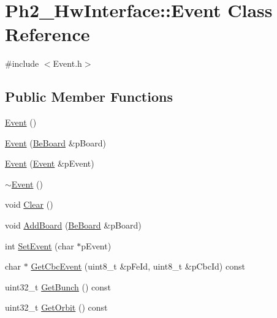 \hypertarget{class_ph2___hw_interface_1_1_event}{\section{Ph2\-\_\-\-Hw\-Interface\-:\-:Event Class Reference}
\label{class_ph2___hw_interface_1_1_event}
}


{\ttfamily \#include $<$Event.\-h$>$}

\subsection*{Public Member Functions}
\begin{DoxyCompactItemize}
\item 
\hyperlink{class_ph2___hw_interface_1_1_event_a61150c0e6dad5ec2068c126e8a018fe1}{Event} ()
\item 
\hyperlink{class_ph2___hw_interface_1_1_event_ae6873ebe9fd64b7d039098e97d815106}{Event} (\hyperlink{class_ph2___hw_description_1_1_be_board}{Be\-Board} \&p\-Board)
\item 
\hyperlink{class_ph2___hw_interface_1_1_event_a3f676bea23859e6417f1ccbade7308df}{Event} (\hyperlink{class_ph2___hw_interface_1_1_event}{Event} \&p\-Event)
\item 
\hyperlink{class_ph2___hw_interface_1_1_event_a2698d395adfcd65d0853676a899127fc}{$\sim$\-Event} ()
\item 
void \hyperlink{class_ph2___hw_interface_1_1_event_ac324585a7a75fb07c51e71317e53ea64}{Clear} ()
\item 
void \hyperlink{class_ph2___hw_interface_1_1_event_a41a2aae19c78d908c738163e56f1be0b}{Add\-Board} (\hyperlink{class_ph2___hw_description_1_1_be_board}{Be\-Board} \&p\-Board)
\item 
int \hyperlink{class_ph2___hw_interface_1_1_event_a67bf8cfaeaec158907932be40b37601d}{Set\-Event} (char $\ast$p\-Event)
\item 
char $\ast$ \hyperlink{class_ph2___hw_interface_1_1_event_a2ee5e2552a84cb78ae902436e0dd77f4}{Get\-Cbc\-Event} (uint8\-\_\-t \&p\-Fe\-Id, uint8\-\_\-t \&p\-Cbc\-Id) const 
\item 
uint32\-\_\-t \hyperlink{class_ph2___hw_interface_1_1_event_ab577a18ce8a9edc17debb67ea8734530}{Get\-Bunch} () const 
\item 
uint32\-\_\-t \hyperlink{class_ph2___hw_interface_1_1_event_a02d8bec5f5249cb80e2835e8aff037d7}{Get\-Orbit} () const 
\item 

\end{DoxyCompactItemize}

